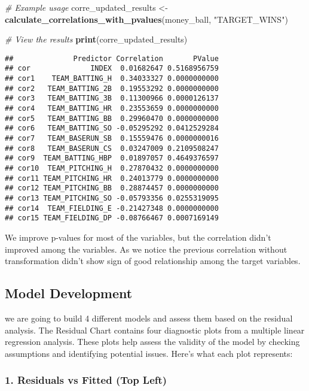 \documentclass[
]{article}
\newenvironment{Shaded}{\begin{snugshade}}{\end{snugshade}}
\newcommand{\CommentTok}[1]{\textcolor[rgb]{0.56,0.35,0.01}{\textit{#1}}}
\newcommand{\FunctionTok}[1]{\textcolor[rgb]{0.13,0.29,0.53}{\textbf{#1}}}
\newcommand{\NormalTok}[1]{#1}
\newcommand{\OtherTok}[1]{\textcolor[rgb]{0.56,0.35,0.01}{#1}}
\newcommand{\StringTok}[1]{\textcolor[rgb]{0.31,0.60,0.02}{#1}}
\begin{document}
\begin{Shaded}
\begin{Highlighting}[]
\CommentTok{\# Example usage}
\NormalTok{corre\_updated\_results }\OtherTok{\textless{}{-}} \FunctionTok{calculate\_correlations\_with\_pvalues}\NormalTok{(money\_ball, }\StringTok{"TARGET\_WINS"}\NormalTok{)}

\CommentTok{\# View the results}
\FunctionTok{print}\NormalTok{(corre\_updated\_results)}
\end{Highlighting}
\end{Shaded}

\begin{verbatim}
##              Predictor Correlation       PValue
## cor              INDEX  0.01682647 0.5168956759
## cor1    TEAM_BATTING_H  0.34033327 0.0000000000
## cor2   TEAM_BATTING_2B  0.19553292 0.0000000000
## cor3   TEAM_BATTING_3B  0.11300966 0.0000126137
## cor4   TEAM_BATTING_HR  0.23553659 0.0000000000
## cor5   TEAM_BATTING_BB  0.29960470 0.0000000000
## cor6   TEAM_BATTING_SO -0.05295292 0.0412529284
## cor7   TEAM_BASERUN_SB  0.15559476 0.0000000016
## cor8   TEAM_BASERUN_CS  0.03247009 0.2109508247
## cor9  TEAM_BATTING_HBP  0.01897057 0.4649376597
## cor10  TEAM_PITCHING_H  0.27870432 0.0000000000
## cor11 TEAM_PITCHING_HR  0.24013779 0.0000000000
## cor12 TEAM_PITCHING_BB  0.28874457 0.0000000000
## cor13 TEAM_PITCHING_SO -0.05793356 0.0255319095
## cor14  TEAM_FIELDING_E -0.21427348 0.0000000000
## cor15 TEAM_FIELDING_DP -0.08766467 0.0007169149
\end{verbatim}

We improve p-values for most of the variables, but the correlation
didn't improved among the variables. As we notice the previous
correlation without transformation didn't show sign of good relationship
among the target variables.

\hypertarget{model-development}{%
\subsection{Model Development}\label{model-development}}

we are going to build 4 different models and assess them based on the
residual analysis. The Residual Chart contains four diagnostic plots
from a multiple linear regression analysis. These plots help assess the
validity of the model by checking assumptions and identifying potential
issues. Here's what each plot represents:

\hypertarget{residuals-vs-fitted-top-left}{%
\subsubsection{\texorpdfstring{1. \textbf{Residuals vs Fitted (Top
Left)}}{1. Residuals vs Fitted (Top Left)}}\label{residuals-vs-fitted-top-left}}
\end{document}

